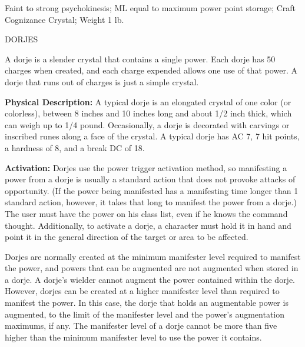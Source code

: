 \documentclass{article}
\begin{document}
Faint to strong psychokinesis; ML equal to maximum power point storage; Craft Cognizance 
Crystal; Weight 1 lb.

\vspace{12pt}
DORJES

A dorje is a slender crystal that contains a single power. Each dorje has 50 charges 
when created, and each charge expended allows one use of that power. A dorje that 
runs out of charges is just a simple crystal.

\textbf{Physical Description:} A typical dorje is an elongated crystal of one color 
(or colorless), between 8 inches and 10 inches long and about 1/2 inch thick, which 
can weigh up to 1/4 pound. Occasionally, a dorje is decorated with carvings or 
inscribed runes along a face of the crystal. A typical dorje has AC 7, 7 hit points, 
a hardness of 8, and a break DC of 18.

\textbf{Activation:} Dorjes use the power trigger activation method, so manifesting 
a power from a dorje is usually a standard action that does not provoke attacks 
of opportunity. (If the power being manifested has a manifesting time longer than 
1 standard action, however, it takes that long to manifest the power from a dorje.) 
The user must have the power on his class list, even if he knows the command thought. 
Additionally, to activate a dorje, a character must hold it in hand and point it 
in the general direction of the target or area to be affected.

Dorjes are normally created at the minimum manifester level required to manifest 
the power, and powers that can be augmented are not augmented when stored in a 
dorje. A dorje's wielder cannot augment the power contained within the dorje. However, 
dorjes can be created at a higher manifester level than required to manifest the 
power. In this case, the dorje that holds an augmentable power is augmented, to 
the limit of the manifester level and the power's augmentation maximums, if any. 
The manifester level of a dorje cannot be more than five higher than the minimum 
manifester level to use the power it contains.
\end{document}
